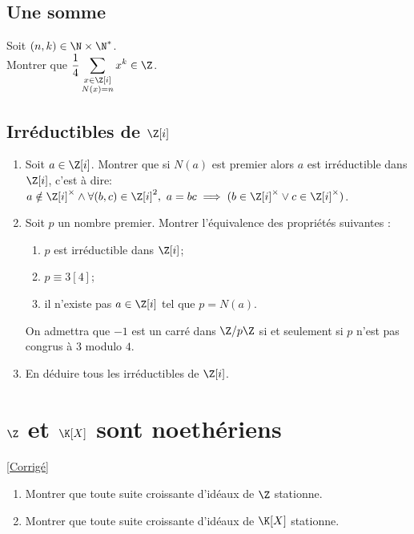 \documentclass[8pt]{book}
\begin{document}
	\subsection{Une somme }
	Soit $(n,k)\in \N \times \N^*$.\\
	Montrer que $\displaystyle\frac{1}{4}\sum\limits_{\substack{x\in \Z[i]\\N(x)=n}}{x^k}\in \Z$.
	
	\subsection{Irréductibles de $\Z[i]$ }
	\begin{enumerate}[leftmargin=*]
		\item Soit $a\in \Z[i]$. Montrer que si $N(a)$ est premier alors $a$ est irréductible dans $\Z[i]$, c'est à dire:\\
		$a\notin \Z[i]^\times\land\forall (b,c)\in \Z[i]^2,\ a=bc\implies (b\in \Z[i]^\times\vee c\in\Z[i]^\times)$.
		\item Soit $p$ un nombre premier. Montrer l'équivalence des propriétés suivantes :
		\begin{enumerate}[label=(\roman*)]
			\item $p$ est irréductible dans $\Z[i]$;
			\item $p\equiv 3[4]$;
			\item il n'existe pas $a\in \Z[i]$ tel que $p=N(a)$.
		\end{enumerate}
		On admettra que $-1$ est un carré dans $\Z/p\Z$ si et seulement si $p$ n'est pas congrus à $3$ modulo $4$.
		\item En déduire tous les irréductibles de $\Z[i]$.
	\end{enumerate}
	
	\section{$\Z$ et $\K[X]$ sont noethériens }
	\label{Z et K{X} sont noethériens}
	\textcolor{blue}{\hyperref[Z et K{X} sont noethériens corrigé]{[Corrigé]}}\\
	\begin{enumerate}[leftmargin=*]
		\item Montrer que toute suite croissante d'idéaux de $\Z$ stationne.
		\item Montrer que toute suite croissante d'idéaux de $\K[X]$ stationne.
	\end{enumerate}
	
\end{document}
